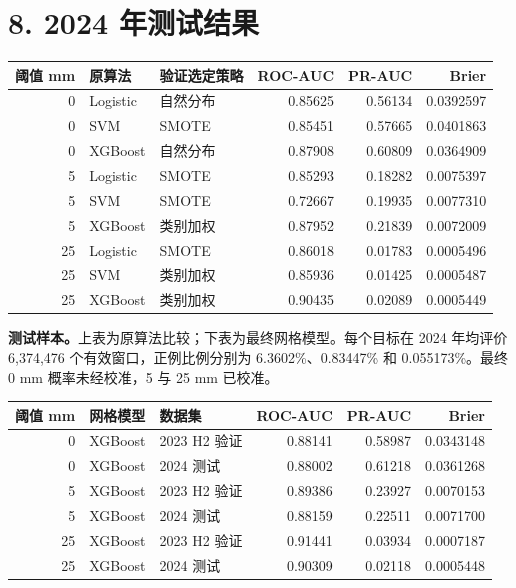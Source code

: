 \documentclass[UTF8,fontset=fandol,10pt,a4paper,landscape]{ctexart}
\begin{document}
\clearpage\section*{8. 2024 年测试结果}
\begin{center}\begin{tabular}{rllrrr}\toprule
阈值 mm & 原算法 & 验证选定策略 & ROC-AUC & PR-AUC & Brier\\\midrule
0 & Logistic & 自然分布 & 0.85625 & 0.56134 & 0.0392597\\
0 & SVM & SMOTE & 0.85451 & 0.57665 & 0.0401863\\
0 & XGBoost & 自然分布 & 0.87908 & 0.60809 & 0.0364909\\
5 & Logistic & SMOTE & 0.85293 & 0.18282 & 0.0075397\\
5 & SVM & SMOTE & 0.72667 & 0.19935 & 0.0077310\\
5 & XGBoost & 类别加权 & 0.87952 & 0.21839 & 0.0072009\\
25 & Logistic & SMOTE & 0.86018 & 0.01783 & 0.0005496\\
25 & SVM & 类别加权 & 0.85936 & 0.01425 & 0.0005487\\
25 & XGBoost & 类别加权 & 0.90435 & 0.02089 & 0.0005449\\
\bottomrule\end{tabular}\end{center}

\textbf{测试样本。}上表为原算法比较；下表为最终网格模型。每个目标在 2024 年均评价 6,374,476 个有效窗口，正例比例分别为 6.3602\%、0.83447\% 和 0.055173\%。最终 0 mm 概率未经校准，5 与 25 mm 已校准。

\begin{center}\begin{tabular}{rllrrr}\toprule
阈值 mm & 网格模型 & 数据集 & ROC-AUC & PR-AUC & Brier\\\midrule
0 & XGBoost & 2023 H2 验证 & 0.88141 & 0.58987 & 0.0343148\\
0 & XGBoost & 2024 测试 & 0.88002 & 0.61218 & 0.0361268\\
5 & XGBoost & 2023 H2 验证 & 0.89386 & 0.23927 & 0.0070153\\
5 & XGBoost & 2024 测试 & 0.88159 & 0.22511 & 0.0071700\\
25 & XGBoost & 2023 H2 验证 & 0.91441 & 0.03934 & 0.0007187\\
25 & XGBoost & 2024 测试 & 0.90309 & 0.02118 & 0.0005448\\
\bottomrule\end{tabular}\end{center}
\end{document}
